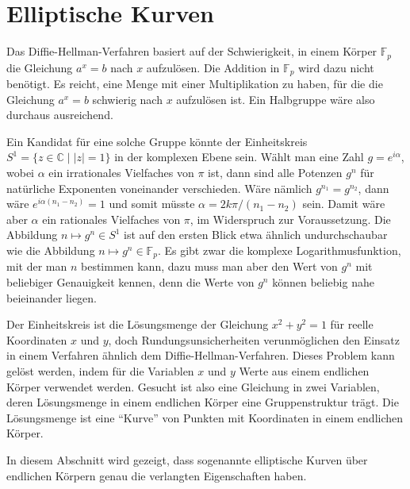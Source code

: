 %
%
%
\section{Elliptische Kurven
\label{buch:section:elliptische-kurven}}
%
Das Diffie-Hellman-Verfahren basiert auf der Schwierigkeit, in einem 
Körper $\mathbb{F}_p$ die Gleichung $a^x=b$ nach $x$ aufzulösen.
Die Addition in $\mathbb{F}_p$ wird dazu nicht benötigt.
Es reicht, eine Menge mit einer Multiplikation zu haben, für die
die Gleichung $a^x=b$ schwierig nach $x$ aufzulösen ist.
Ein Halbgruppe wäre also durchaus ausreichend.

Ein Kandidat für eine solche Gruppe könnte der Einheitskreis
$S^1=\{z\in\mathbb{C} \mid |z|=1\}$ in der komplexen Ebene sein.
Wählt man eine Zahl $g=e^{i\alpha}$, wobei $\alpha$ ein irrationales
Vielfaches von $\pi$ ist, dann sind alle Potenzen $g^n$ für natürliche
Exponenten voneinander verschieden.
Wäre nämlich $g^{n_1}=g^{n_2}$, dann wäre $e^{i\alpha(n_1-n_2)}=1$ und
somit müsste $\alpha=2k\pi/(n_1-n_2)$ sein.
Damit wäre aber $\alpha$ ein rationales Vielfaches von $\pi$, im Widerspruch
zur Voraussetzung.
Die Abbildung $n\mapsto g^n\in S^1$ ist auf den ersten Blick etwa ähnlich
undurchschaubar wie die Abbildung $n\mapsto g^n\in\mathbb{F}_p$.
Es gibt zwar die komplexe Logarithmusfunktion, mit der man $n$ bestimmen
kann, dazu muss man aber den Wert von $g^n$ mit beliebiger Genauigkeit
kennen, denn die Werte von $g^n$ können beliebig nahe beieinander liegen.

Der Einheitskreis ist die Lösungsmenge der Gleichung $x^2+y^2=1$ für
reelle Koordinaten $x$ und $y$,
doch Rundungsunsicherheiten verunmöglichen den Einsatz in einem 
Verfahren ähnlich dem Diffie-Hellman-Verfahren.
Dieses Problem kann gelöst werden, indem für die Variablen $x$ und $y$ Werte
aus einem endlichen Körper verwendet werden.
Gesucht ist also eine Gleichung in zwei Variablen, deren Lösungsmenge
in einem endlichen Körper eine Gruppenstruktur trägt.
Die Lösungsmenge ist eine ``Kurve'' von Punkten mit
%
Koordinaten in einem endlichen Körper.

In diesem Abschnitt wird gezeigt, dass sogenannte elliptische Kurven
über endlichen Körpern genau die verlangten Eigenschaften haben.


